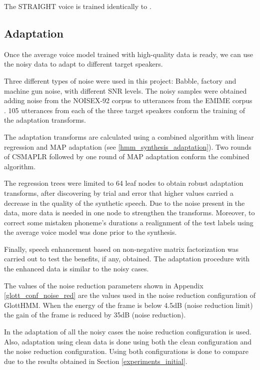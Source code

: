 The STRAIGHT voice is trained identically to \cite{karhila_jstsp_14}.

\subsection{Adaptation}
\label{experiments_adaptation}
Once the average voice model trained with high-quality data is ready, we can use the noisy data to adapt to different target speakers.

Three different types of noise were used in this project: Babble, factory and machine gun noise, with different SNR levels.
%
The noisy samples were obtained adding noise from the NOISEX-92 corpus \cite{Varga1993247} to utterances from the EMIME corpus \cite{wester_accent2010}.
%
105 utterances from each of the three target speakers conform the training of the adaptation transforms.

The adaptation transforms are calculated using a combined algorithm with linear regression and MAP adaptation (see \ref{hmm_synthesis_adaptation}).
%
Two rounds of CSMAPLR followed by one round of MAP adaptation conform the combined algorithm.

The regression trees were limited to 64 leaf nodes to obtain robust adaptation transforms, after discovering by trial and error that higher values carried a decrease in the quality of the synthetic speech.
%
Due to the noise present in the data, more data is needed in one node to strengthen the transforms.
%
Moreover, to correct some mistaken phoneme's durations a realignment of the test labels using the average voice model was done prior to the synthesis.

Finally, speech enhancement based on non-negative matrix factorization \cite{raj_interspeech2010} was carried out to test the benefits, if any, obtained.
%
The adaptation procedure with the enhanced data is similar to the noisy cases.

The values of the noise reduction parameters shown in Appendix \ref{glott_conf_noise_red} are the values used in the noise reduction configuration of GlottHMM.
%
When the energy of the frame is below 4.5dB (noise reduction limit) the gain of the frame is reduced by 35dB (noise reduction).

In the adaptation of all the noisy cases the noise reduction configuration is used.
%
Also, adaptation using clean data is done using both the clean configuration and the noise reduction configuration.
%
Using both configurations is done to compare due to the results obtained in Section \ref{experiments_initial}.

